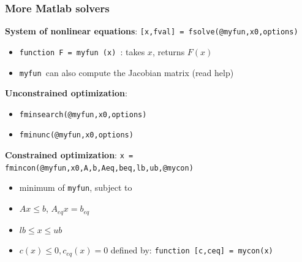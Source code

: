 \documentclass[bigger]{beamer}
\begin{document}
\begin{frame}%
\frametitle{More Matlab solvers}

\textbf{System of nonlinear equations}:\newline
\qquad \texttt{[x,fval] = fsolve(@myfun,x0,options)}

\begin{itemize}
\item \texttt{function F = myfun (x) }: takes $x$, returns $F(x)$

\item \texttt{myfun }can also compute the Jacobian matrix (read help)
\end{itemize}

\textbf{Unconstrained optimization}:

\begin{itemize}
\item \texttt{fminsearch(@myfun,x0,options)}

\item \texttt{fminunc(@myfun,x0,options)}
\end{itemize}

\textbf{Constrained optimization}:\newline
\qquad \texttt{x = fmincon(@myfun,x0,A,b,Aeq,beq,lb,ub,@mycon)}

\begin{itemize}
\item minimum of \texttt{myfun}, subject to

\item $Ax\leq b$, $A_{eq}x=b_{eq}$

\item $lb\leq x\leq ub$

\item $c(x)\leq 0,c_{eq}(x)=0$ defined by:\newline
\qquad \texttt{function [c,ceq] = mycon(x)}
\end{itemize}

\end{frame}%
\end{document}
